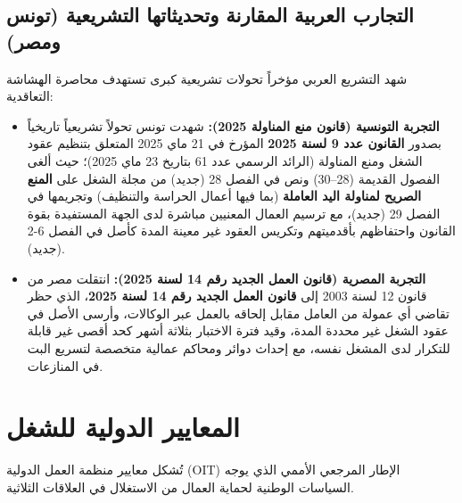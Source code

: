 \subsection{التجارب العربية المقارنة وتحديثاتها التشريعية (تونس ومصر)}
شهد التشريع العربي مؤخراً تحولات تشريعية كبرى تستهدف محاصرة الهشاشة التعاقدية:
\begin{itemize}[leftmargin=*, itemsep=6pt]
    \item \textbf{التجربة التونسية (قانون منع المناولة \textenglish{2025}):} شهدت تونس تحولاً تشريعياً تاريخياً بصدور \textbf{القانون عدد \textenglish{9} لسنة \textenglish{2025}} المؤرخ في \textenglish{21} ماي \textenglish{2025} المتعلق بتنظيم عقود الشغل ومنع المناولة (الرائد الرسمي عدد \textenglish{61} بتاريخ \textenglish{23} ماي \textenglish{2025})؛ حيث ألغى الفصول القديمة (\textenglish{28}--\textenglish{30}) ونص في الفصل \textenglish{28} (جديد) من مجلة الشغل على \textbf{المنع الصريح لمناولة اليد العاملة} (بما فيها أعمال الحراسة والتنظيف) وتجريمها في الفصل \textenglish{29} (جديد)، مع ترسيم العمال المعنيين مباشرة لدى الجهة المستفيدة بقوة القانون واحتفاظهم بأقدميتهم وتكريس العقود غير معينة المدة كأصل في الفصل \textenglish{6-2} (جديد).
    \item \textbf{التجربة المصرية (قانون العمل الجديد رقم \textenglish{14} لسنة \textenglish{2025}):} انتقلت مصر من قانون \textenglish{12} لسنة \textenglish{2003} إلى \textbf{قانون العمل الجديد رقم \textenglish{14} لسنة \textenglish{2025}}، الذي حظر تقاضي أي عمولة من العامل مقابل إلحاقه بالعمل عبر الوكالات، وأرسى الأصل في عقود الشغل غير محددة المدة، وقيد فترة الاختبار بثلاثة أشهر كحد أقصى غير قابلة للتكرار لدى المشغل نفسه، مع إحداث دوائر ومحاكم عمالية متخصصة لتسريع البت في المنازعات.
\end{itemize}

\section{المعايير الدولية للشغل}

تُشكل معايير منظمة العمل الدولية (\textenglish{OIT}) الإطار المرجعي الأممي الذي يوجه السياسات الوطنية لحماية العمال من الاستغلال في العلاقات الثلاثية.

